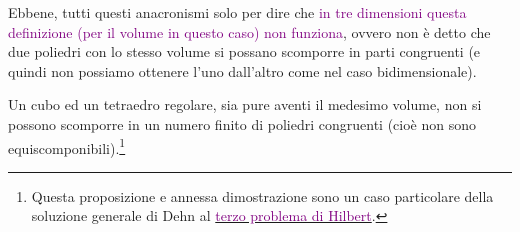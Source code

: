 Ebbene, tutti questi anacronismi solo per dire che \textcolor{purple}{in tre dimensioni questa definizione (per il volume in questo caso) non funziona}, ovvero non è detto che due poliedri con lo stesso volume si possano scomporre in parti congruenti (e quindi non possiamo ottenere l'uno dall'altro come nel caso bidimensionale).

\begin{theorem}
	Un cubo ed un tetraedro regolare, sia pure aventi il medesimo volume, non si possono scomporre in un numero finito di poliedri congruenti (cioè non sono equiscomponibili).\footnote{Questa proposizione
	e annessa dimostrazione sono un caso particolare della soluzione generale di Dehn al \href{https://en.wikipedia.org/wiki/Hilbert\%27s_third_problem}{\textcolor{purple}{terzo problema di Hilbert}}.}
\end{theorem}

